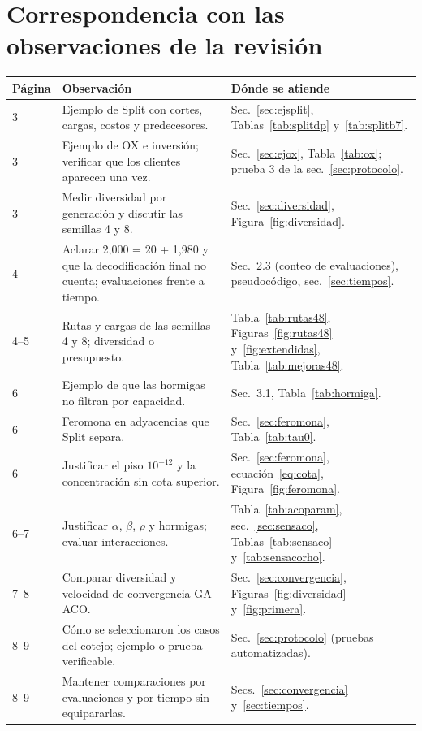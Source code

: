 \documentclass[11pt,a4paper]{article}
\numberwithin{equation}{section}
\begin{document}
\section{Correspondencia con las observaciones de la revisión}

\begin{longtable}{p{1.4cm}p{7.2cm}p{6.6cm}}\toprule
Página & Observación & Dónde se atiende\\\midrule\endhead
3 & Ejemplo de Split con cortes, cargas, costos y predecesores. & Sec.~\ref{sec:ejsplit}, Tablas~\ref{tab:splitdp} y~\ref{tab:splitb7}.\\
3 & Ejemplo de OX e inversión; verificar que los clientes aparecen una vez. & Sec.~\ref{sec:ejox}, Tabla~\ref{tab:ox}; prueba 3 de la sec.~\ref{sec:protocolo}.\\
3 & Medir diversidad por generación y discutir las semillas 4 y 8. & Sec.~\ref{sec:diversidad}, Figura~\ref{fig:diversidad}.\\
4 & Aclarar 2,000 = 20 + 1,980 y que la decodificación final no cuenta; evaluaciones frente a tiempo. & Sec.~2.3 (conteo de evaluaciones), pseudocódigo, sec.~\ref{sec:tiempos}.\\
4--5 & Rutas y cargas de las semillas 4 y 8; diversidad o presupuesto. & Tabla~\ref{tab:rutas48}, Figuras~\ref{fig:rutas48} y~\ref{fig:extendidas}, Tabla~\ref{tab:mejoras48}.\\
6 & Ejemplo de que las hormigas no filtran por capacidad. & Sec.~3.1, Tabla~\ref{tab:hormiga}.\\
6 & Feromona en adyacencias que Split separa. & Sec.~\ref{sec:feromona}, Tabla~\ref{tab:tau0}.\\
6 & Justificar el piso \(10^{-12}\) y la concentración sin cota superior. & Sec.~\ref{sec:feromona}, ecuación~\eqref{eq:cota}, Figura~\ref{fig:feromona}.\\
6--7 & Justificar \(\alpha\), \(\beta\), \(\rho\) y hormigas; evaluar interacciones. & Tabla~\ref{tab:acoparam}, sec.~\ref{sec:sensaco}, Tablas~\ref{tab:sensaco} y~\ref{tab:sensacorho}.\\
7--8 & Comparar diversidad y velocidad de convergencia GA--ACO. & Sec.~\ref{sec:convergencia}, Figuras~\ref{fig:diversidad} y~\ref{fig:primera}.\\
8--9 & Cómo se seleccionaron los casos del cotejo; ejemplo o prueba verificable. & Sec.~\ref{sec:protocolo} (pruebas automatizadas).\\
8--9 & Mantener comparaciones por evaluaciones y por tiempo sin equipararlas. & Secs.~\ref{sec:convergencia} y~\ref{sec:tiempos}.\\

\end{longtable}
\end{document}
